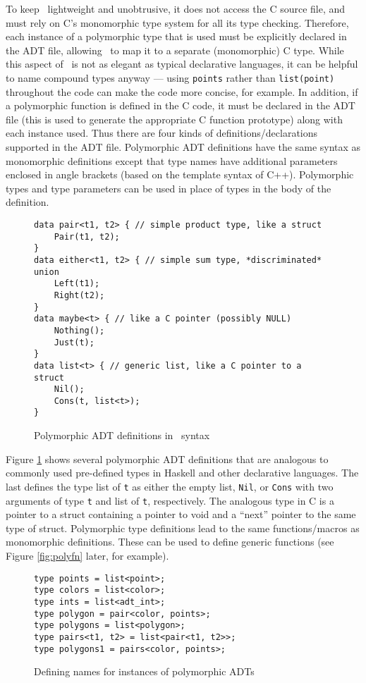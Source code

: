 To keep \adtpp\ lightweight and unobtrusive, it does not access the C
source file, and must rely on C's monomorphic type system for all its type
checking. Therefore, each instance of a polymorphic type that is used
must be explicitly declared in the ADT file, allowing \adtpp\ to 
map it to a separate (monomorphic) C type.
While this aspect of \adtpp\ is not as elegant as typical 
declarative languages, it can be helpful to name compound
types anyway --- using \texttt{points} rather than
\texttt{list(point)} throughout
the code can make the code more concise, for example.  In addition, if
a polymorphic function is defined in the C code, it must be declared in
the ADT file (this is used to generate the appropriate C function
prototype) along with each instance used.  Thus there are four kinds
of definitions/declarations supported in the ADT file.  Polymorphic ADT
definitions have the same syntax as monomorphic definitions except that
type names have additional parameters enclosed in angle
brackets (based on the template syntax of C++).
Polymorphic types and type parameters can be used in place
of types in the body of the definition.

\begin{figure}[!ht]
\begin{verbatim}
data pair<t1, t2> { // simple product type, like a struct
    Pair(t1, t2);
}
data either<t1, t2> { // simple sum type, *discriminated* union
    Left(t1);
    Right(t2);
}
data maybe<t> { // like a C pointer (possibly NULL)
    Nothing();
    Just(t);
}
data list<t> { // generic list, like a C pointer to a struct
    Nil();
    Cons(t, list<t>);
}
\end{verbatim}
\caption{Polymorphic ADT definitions in \adtpp\ syntax}
\label{fig:pdecl}
\end{figure}

Figure \ref{fig:pdecl} shows several polymorphic ADT
definitions that
are analogous to commonly used pre-defined types in Haskell and other
declarative languages.  The last defines the type list of \texttt{t} as
either the empty list, \texttt{Nil}, or \texttt{Cons} with two arguments
of type \texttt{t} and list of \texttt{t}, respectively.  The analogous
type in C is a pointer to a struct containing a pointer to void and a
``next'' pointer to the same type of struct.  Polymorphic type
definitions lead to the same functions/macros as monomorphic
definitions.  These can be used to define generic functions (see Figure
\ref{fig:polyfn} later, for example).

\begin{figure}[!ht]
\begin{verbatim}
type points = list<point>;
type colors = list<color>;
type ints = list<adt_int>;
type polygon = pair<color, points>;
type polygons = list<polygon>;
type pairs<t1, t2> = list<pair<t1, t2>>;
type polygons1 = pairs<color, points>;
\end{verbatim}
\caption{Defining names for instances of polymorphic ADTs}
\label{fig:insts}
\end{figure}

